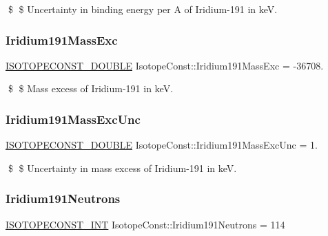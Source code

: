 \$ \$ Uncertainty in binding energy per A of Iridium-\/191 in keV. \mbox{\label{group___isotope_const-_iridium-_ir191_gad478e00ab70990378d5dff03d1c8b153}} 
\subsubsection{\texorpdfstring{Iridium191\+Mass\+Exc}{Iridium191MassExc}}
{\footnotesize\ttfamily \mbox{\hyperlink{group___isotope_const-_macros_ga8f45a7272ce02c0b4c65c44636ed719a}{I\+S\+O\+T\+O\+P\+E\+C\+O\+N\+S\+T\+\_\+\+D\+O\+U\+B\+LE}} Isotope\+Const\+::\+Iridium191\+Mass\+Exc = -\/36708.}

\$ \$ Mass excess of Iridium-\/191 in keV. \mbox{\label{group___isotope_const-_iridium-_ir191_ga99f4422ca7e7aeca0e040a9905c0404b}} 
\subsubsection{\texorpdfstring{Iridium191\+Mass\+Exc\+Unc}{Iridium191MassExcUnc}}
{\footnotesize\ttfamily \mbox{\hyperlink{group___isotope_const-_macros_ga8f45a7272ce02c0b4c65c44636ed719a}{I\+S\+O\+T\+O\+P\+E\+C\+O\+N\+S\+T\+\_\+\+D\+O\+U\+B\+LE}} Isotope\+Const\+::\+Iridium191\+Mass\+Exc\+Unc = 1.}

\$ \$ Uncertainty in mass excess of Iridium-\/191 in keV. \mbox{\label{group___isotope_const-_iridium-_ir191_ga7d2fb93c48fad814adfd3ad1a91e26eb}} 
\subsubsection{\texorpdfstring{Iridium191\+Neutrons}{Iridium191Neutrons}}
{\footnotesize\ttfamily \mbox{\hyperlink{group___isotope_const-_macros_ga5f18360b3e99483a35c32d789e62621c}{I\+S\+O\+T\+O\+P\+E\+C\+O\+N\+S\+T\+\_\+\+I\+NT}} Isotope\+Const\+::\+Iridium191\+Neutrons = 114}

